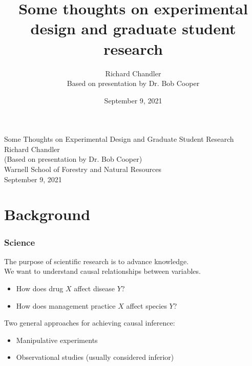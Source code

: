 \documentclass[color=usenames,dvipsnames]{beamer}\usepackage[]{graphicx}\usepackage[]{color}
\title[slides]{Some thoughts on experimental design and
  graduate student research}
\author{Richard Chandler \\ Based on presentation by Dr. Bob Cooper}
\date{September 9, 2021}
\begin{document}
\begin{frame}[plain]
  \centering
  \LARGE
  Some Thoughts on Experimental Design and Graduate Student Research \\
  \vfill
  \large
  Richard Chandler \\
  (Based on presentation by Dr. Bob Cooper) \\
  Warnell School of Forestry and Natural Resources \\
  September 9, 2021
\end{frame}





\section{Background}


\begin{frame}
  \frametitle{Science}
  The purpose of scientific research is to advance knowledge. \\
  \pause
  \vfill
  We want to understand causal relationships between variables. \\
  \begin{itemize}
    \item How does drug $X$ affect disease $Y$?
    \item How does management practice $X$ affect species $Y$?
  \end{itemize}
  \pause
  \vfill
  Two general approaches for achieving causal inference:
  \begin{itemize}
    \item Manipulative experiments
    \item Observational studies (usually considered inferior)
  \end{itemize}
\end{frame}



\end{document}
